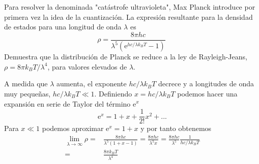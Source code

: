 \documentclass[addpoints,spanish, 12pt,a4paper]{exam}
\author{David De Sancho}
\begin{document}
\vspace{0.1in} %


\begin{center}
    \gradetable[h][questions]
\end{center}
\vspace{0.1in} %


\begin{questions} %

    \question[1] Para resolver la denominada "catástrofe
    ultravioleta", Max Planck introduce por primera vez 
    la idea de la cuantización. La expresión resultante
    para la densidad de estados para una longitud de onda
    $\lambda$ es  
    \begin{equation*}
        \rho=\frac{8\pi hc}{\lambda^5(\mathrm{e}^{hc/\lambda k_BT}-1)}\
    \end{equation*}
    Demuestra que la distribución de Planck se reduce 
    a la ley de Rayleigh-Jeans, 
    $\rho=8\pi k_BT/\lambda^4$, 
    para valores elevados de $\lambda$.
    
    \begin{solution}
    \selectfont

    A medida que $\lambda$ aumenta, el exponente
    $hc/\lambda k_BT$ decrece y a longitudes de 
    onda muy pequeñas, $hc/\lambda k_BT\ll 1$. 
    Definiendo $x=hc/\lambda k_BT$ podemos hacer 
    una expansión en serie de Taylor del término $\mathrm{e}^x$
    \begin{equation*}
        \mathrm{e}^x= 1 + x + \frac{1}{2!}x^2+...
    \end{equation*}
    Para $x\ll1$ podemos aproximar $\mathrm{e}^x= 1 + x$
    y por tanto obtenemos 
     \begin{align*}
        \lim_{\lambda\rightarrow\infty} \rho =&
        \frac{8\pi hc}{\lambda^5(1+x-1)} = 
         \frac{8\pi hc}{\lambda^5x}=
         \frac{8\pi hc}{\lambda^5}\frac{1}{hc/\lambda k_BT} \\
         = &\frac{8\pi k_BT}{\lambda^4}
    \end{align*}
    \vspace*{10\baselineskip}
    \end{solution}
    

\end{questions}
\end{document}
